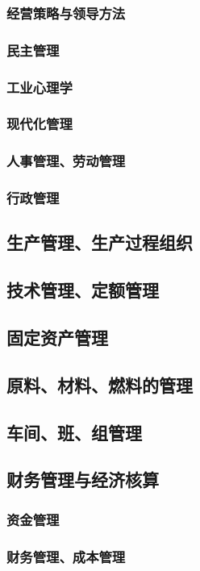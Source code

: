\documentclass[UTF8]{../../RepresentationUniverse}
\begin{document}
        \subsubsection{经营策略与领导方法}
        \subsubsection{民主管理}
        \subsubsection{工业心理学}
        \subsubsection{现代化管理}
        \subsubsection{人事管理、劳动管理}
        \subsubsection{行政管理}
    \subsection{生产管理、生产过程组织}
    \subsection{技术管理、定额管理}
    \subsection{固定资产管理}
    \subsection{原料、材料、燃料的管理}
    \subsection{车间、班、组管理}
    \subsection{财务管理与经济核算}
        \subsubsection{资金管理}
        \subsubsection{财务管理、成本管理}
\end{document}

